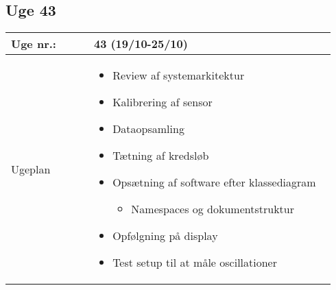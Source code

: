 	\subsection{Uge 43} \label{app:logUge43}
	\begin{longtable}{|p{0.24\linewidth}|p{0.7\linewidth}|}
		\hline
		Uge nr.: & 43 (19/10-25/10)\\ \hline
		Ugeplan & 
		\begin{itemize}
			\item Review af systemarkitektur 
			\item Kalibrering af sensor
			\item Dataopsamling 
			\item Tætning af kredsløb
			\item Opsætning af software efter klassediagram
			\begin{itemize}
				\item Namespaces og dokumentstruktur
			\end{itemize}
			\item Opfølgning på display 
			\item Test setup til at måle oscillationer 
		\end{itemize}
		

\end{longtable}
